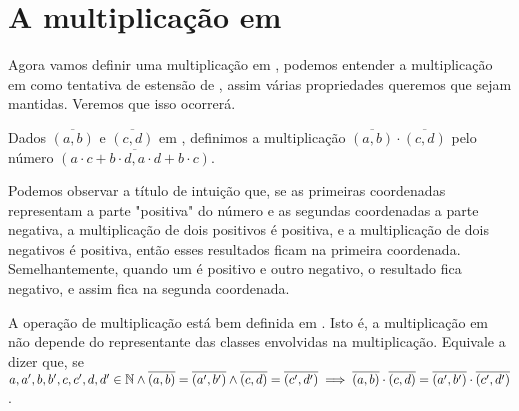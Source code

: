 \documentclass[../main.tex]{subfiles}
\begin{document}
\section{A multiplicação em \Z}
Agora vamos definir uma multiplicação em \Z, podemos entender a multiplicação em \Z como tentativa de estensão de \N, assim várias propriedades queremos que sejam mantidas. Veremos que isso ocorrerá.
\begin{defi}
    Dados $\overline{(a,b)}$ e $\overline{(c,d)}$ em \Z, definimos a multiplicação $\overline{(a,b)} \cdot \overline{(c,d)}$ pelo número $\overline{(a \cdot c + b \cdot d, a \cdot d + b \cdot c)}$.
\end{defi}
Podemos observar a título de intuição que, se as primeiras coordenadas representam a parte "positiva" do número e as segundas coordenadas a parte negativa, a multiplicação de dois positivos é positiva, e a multiplicação de dois negativos é positiva, então esses resultados ficam na primeira coordenada. Semelhantemente, quando um é positivo e outro negativo, o resultado fica negativo, e assim fica na segunda coordenada.
\begin{teo}
    A operação de multiplicação está bem definida em \Z. Isto é, a multiplicação em \Z não depende do representante das classes envolvidas na multiplicação. Equivale a dizer que, se \\
    $a,a',b,b',c,c',d,d' \in \mathbb{N} \land \overline{(a,b)} = \overline{(a',b')} \land \overline{(c,d)} = \overline{(c',d')}
    \implies \overline{(a,b)} \cdot \overline{(c,d)} = \overline{(a',b')} \cdot \overline{(c',d')} $.
\end{teo}
\end{document}

